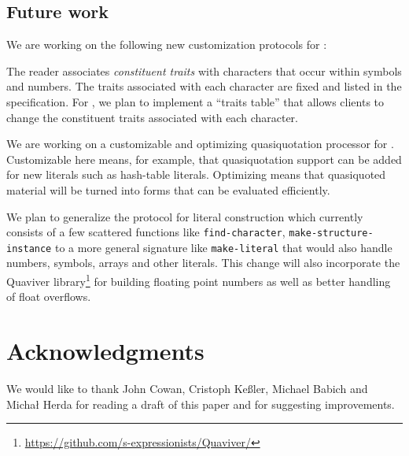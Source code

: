 

\subsection{Future work}

We are working on the following new customization protocols for
\eclector{}:

The \cl{} reader associates \emph{constituent traits} with characters
that occur within symbols and numbers.  The traits associated with
each character are fixed and listed in the \cl{} specification.  For
\eclector, we plan to implement a ``traits table'' that allows clients
to change the constituent traits associated with each character.

We are working on a customizable and optimizing quasiquotation
processor for \eclector{}.  Customizable here means, for example, that
quasiquotation support can be added for new literals such as
hash-table literals.  Optimizing means that quasiquoted material will
be turned into forms that can be evaluated efficiently.

We plan to generalize the protocol for literal construction which
currently consists of a few scattered functions like
\texttt{find-character},
\texttt{make-structure-instance} to a more general signature
like \texttt{make-literal} that would also handle numbers,
symbols, arrays and other literals.  This change will also incorporate
the Quaviver
library\footnote{\url{https://github.com/s-expressionists/Quaviver/}}
for building floating point numbers as well as better handling of
float overflows.

\section{Acknowledgments}

We would like to thank John Cowan, Cristoph Keßler, Michael Babich and
Michał Herda for reading a draft of this paper and for suggesting
improvements.


